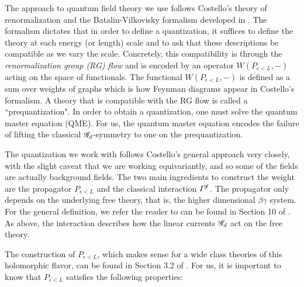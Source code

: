 The approach to quantum field theory we use follows Costello's theory of renormalization and the Batalin-Vilkovisky formalism developed in \cite{CosRenorm}.
The formalism dictates that in order to define a quantization, it suffices to define the theory at each energy (or length) scale and to ask that these descriptions be compatible as we vary the scale.
Concretely, this compatibility is through the {\em renormalization group (RG) flow} and is encoded by an operator $W(P_{\epsilon < L}, -)$ acting on the space of functionals. 
The functional $W(P_{\epsilon < L},-)$ is defined as a sum over weights of graphs which is how Feynman diagrams appear in Costello's formalism.
A theory that is compatible with the RG flow is called a ``prequantization". 
In order to obtain a quantization, one must solve the quantum master equation (QME). 
For us, the quantum master equation encodes the failure of lifting the classical $\mathscr G_d$-symmetry to one on the prequantization.

The quantization we work with follows Costello's general approach very closely, with the slight caveat that we are working equivariantly, and so some of the fields are actually background fields. 
The two main ingredients to construct the weight are the propagator $P_{\epsilon < L}$ and the classical interaction $I^{\mathscr G}$. 
The propagator only depends on the underlying free theory, that is, the higher dimensional $\beta\gamma$ system. 
For the general definition, we refer the reader to can be found in Section 10 of \cite{CG2}.
As above, the interaction describes how the linear currents $\mathscr G_d$ act on the free theory. 

The construction of $P_{\epsilon<L}$, which makes sense for a wide class theories of this holomorphic flavor, can be found in Section 3.2 of \cite{BWhol}.
For us, it is important to know that $P_{\epsilon<L}$ satisfies the following properties:

